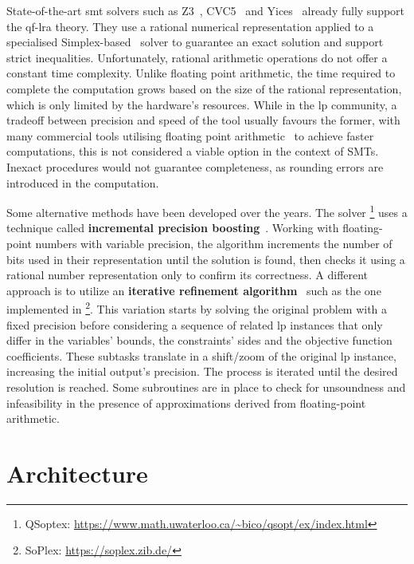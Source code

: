 \documentclass[runningheads]{llncs}
\begin{document}
State-of-the-art \gls{smt} solvers such as Z3~\cite{ref:z3}, CVC5~\cite{ref:cvc5} and Yices~\cite{ref:yices} already fully support the \gls{qf-lra} theory.
They use a rational numerical representation applied to a specialised Simplex-based~\cite{ref:simplex} solver to guarantee an exact solution and support strict inequalities.
Unfortunately, rational arithmetic operations do not offer a constant time complexity. %
Unlike floating point arithmetic, the time required to complete the computation grows based on the size of the rational representation, which is only limited by the hardware's resources.
While in the \gls{lp} community, a tradeoff between precision and speed of the tool usually favours the former, with many commercial tools utilising floating point arithmetic~\cite{ref:gurobi} to achieve faster computations, this is not considered a viable option in the context of SMTs.
Inexact procedures would not guarantee completeness, as rounding errors are introduced in the computation.

Some alternative methods have been developed over the years.
The \qsoptex solver \footnote{QSoptex: \url{https://www.math.uwaterloo.ca/~bico/qsopt/ex/index.html}} uses a technique called \textbf{incremental precision boosting}~\cite{ref:precision-boosting}.
Working with floating-point numbers with variable precision, the algorithm increments the number of bits used in their representation until the solution is found, then checks it using a rational number representation only to confirm its correctness.
A different approach is to utilize an \textbf{iterative refinement algorithm}~\cite{ref:iterative-refinement} such as the one implemented in \soplex \footnote{SoPlex: \url{https://soplex.zib.de/}}.
This variation starts by solving the original problem with a fixed precision before considering a sequence of related \gls{lp} instances that only differ in the variables' bounds, the constraints' sides and the objective function coefficients.
These subtasks translate in a shift/zoom of the original \gls{lp} instance, increasing the initial output's precision.
The process is iterated until the desired resolution is reached.
Some subroutines are in place to check for unsoundness and infeasibility in the presence of approximations derived from floating-point arithmetic.

\section{Architecture}
\label{sec:architecture}
\end{document}
